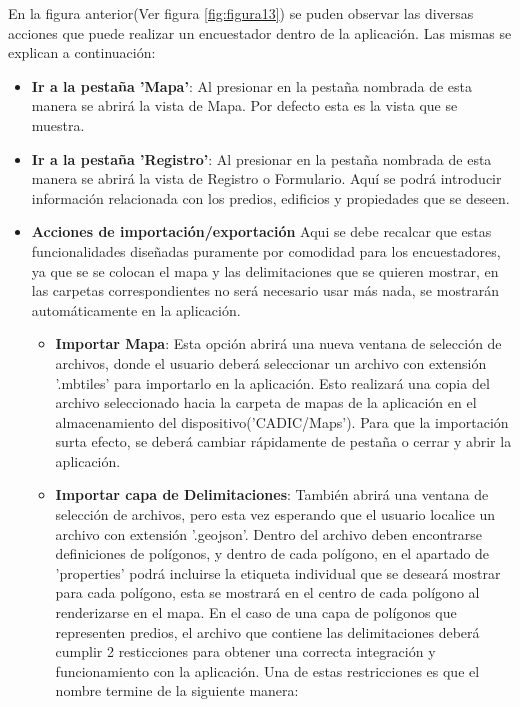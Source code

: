 En la figura anterior(Ver figura \ref{fig:figura13}) se puden observar las diversas acciones que puede realizar un encuestador dentro de
la aplicación. Las mismas se explican a continuación:
\begin{itemize}
    \item \textbf{Ir a la pestaña 'Mapa'}: Al presionar en la pestaña nombrada de esta manera se abrirá la vista de Mapa. Por defecto esta es la vista que se muestra.
    \item \textbf{Ir a la pestaña 'Registro'}: Al presionar en la pestaña nombrada de esta manera se abrirá la vista de Registro o Formulario. Aquí se podrá introducir información relacionada con los predios, edificios y propiedades que se deseen.
    \item \textbf{Acciones de importación/exportación}
          Aqui se debe recalcar que estas funcionalidades diseñadas puramente por comodidad para los encuestadores, ya que se se colocan el mapa y las
          delimitaciones que se quieren mostrar, en las carpetas correspondientes no será necesario usar más nada, se mostrarán automáticamente en la aplicación.
          \begin{itemize}
              \item \textbf{Importar Mapa}: Esta opción abrirá una nueva ventana de selección de archivos, donde el usuario deberá seleccionar
                    un archivo con extensión '.mbtiles' para importarlo en la aplicación. Esto realizará una copia del archivo seleccionado hacia
                    la carpeta de mapas de la aplicación en el almacenamiento del dispositivo('CADIC/Maps'). Para que la importación surta efecto,
                    se deberá cambiar rápidamente de pestaña o cerrar y abrir la aplicación.
              \item \label{item:importaciongeojson}\textbf{Importar capa de Delimitaciones}: También abrirá una ventana de selección de archivos, pero esta vez esperando que
                    el usuario localice un archivo con extensión '.geojson'. Dentro del archivo deben encontrarse definiciones de polígonos, y
                    dentro de cada polígono, en el apartado de 'properties' podrá incluirse la etiqueta individual que se deseará mostrar para
                    cada polígono, esta se mostrará en el centro de cada polígono al renderizarse en el mapa. En el caso de una capa de polígonos
                    que representen predios, el archivo que contiene las delimitaciones deberá cumplir 2 resticciones para obtener
                    una correcta integración y funcionamiento con la aplicación. Una de estas restricciones es que el nombre termine de la siguiente manera:

\end{itemize}
\end{itemize}
